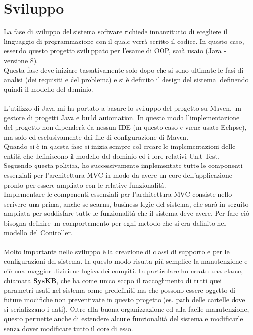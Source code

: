 \documentclass{article}
\begin{document}
  \section{Sviluppo}
  La fase di sviluppo del sistema software richiede innanzitutto di scegliere il linguaggio di programmazione con il quale verrà scritto il codice. In questo caso, essendo questo progetto
  sviluppato per l'esame di OOP, sarà usato (Java - versione 8).\\
  Questa fase deve iniziare tassativamente solo dopo che si sono ultimate le fasi di analisi (dei requisiti e del problema) e si è definito il design del sistema, definendo quindi
  il modello del dominio.\\
  \\L'utilizzo di Java mi ha portato a basare lo sviluppo del progetto su Maven, un gestore di progetti Java e build automation. In questo modo l'implementazione del progetto non dipenderà da nessun IDE (in questo caso
  è viene usato Eclipse), ma solo ed esclusivamente dai file di configurazione di Maven.\\
  Quando si è in questa fase si inizia sempre col creare le implementazioni delle entità che definiscono il modello del dominio ed i loro relativi Unit Test. Seguendo questa politica, ho successivamente
  implementato tutte le componenti essenziali per l'architettura MVC in modo da avere un core dell'applicazione pronto per essere ampliato con le relative funzionalità.\\
  Implementare le componenti essenziali per l'architettura MVC consiste nello scrivere una prima, anche se scarna, business logic del sistema, che sarà in seguito ampliata per soddisfare tutte le funzionalità
  che il sistema deve avere. Per fare ciò bisogna definire un comportamento per ogni metodo che si era definito nel modello del Controller.\\
  \\Molto importante nello sviluppo è la creazione di classi di supporto e per le configurazioni del sistema. In questo modo risulta più semplice
  la manutenzione e c'è una maggior divisione logica dei compiti. In particolare ho creato una classe, chiamata \textbf{SysKB}, che ha come unico scopo il raccoglimento
  di tutti quei parametri usati nel sistema come predefiniti ma che possono essere oggetto di future modifiche non preventivate in questo progetto (es. path
  delle cartelle dove si serializzano i dati). Oltre alla buona organizzazione ed alla facile manutenzione, questo permette anche di estendere alcune funzionalità
  del sistema e modificarle senza dover modificare tutto il core di esso.
\end{document}
